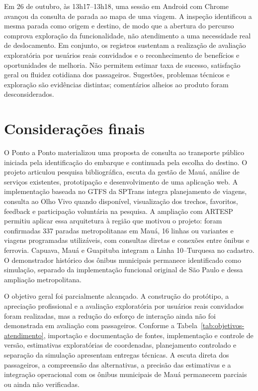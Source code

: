 \documentclass[12pt,oneside,a4paper,brazil,chapter=TITLE]{abntex2}
\begin{document}
Em 26 de outubro, às 13h17--13h18, uma sessão em Android com Chrome avançou da consulta de parada ao mapa de uma viagem. A inspeção identificou a mesma parada como origem e destino, de modo que a abertura do percurso comprova exploração da funcionalidade, não atendimento a uma necessidade real de deslocamento. Em conjunto, os registros sustentam a realização de avaliação exploratória por usuários reais convidados e o reconhecimento de benefícios e oportunidades de melhoria. Não permitem estimar taxa de sucesso, satisfação geral ou fluidez cotidiana dos passageiros. Sugestões, problemas técnicos e exploração são evidências distintas; comentários alheios ao produto foram desconsiderados.



\chapter{Considerações finais}
O Ponto a Ponto materializou uma proposta de consulta ao transporte público iniciada pela identificação do embarque e continuada pela escolha do destino. O projeto articulou pesquisa bibliográfica, escuta da gestão de Mauá, análise de serviços existentes, prototipação e desenvolvimento de uma aplicação web. A implementação baseada no GTFS da SPTrans integra planejamento de viagens, consulta ao Olho Vivo quando disponível, visualização dos trechos, favoritos, feedback e participação voluntária na pesquisa. A ampliação com ARTESP permitiu aplicar essa arquitetura à região que motivou o projeto: foram confirmadas 337 paradas metropolitanas em Mauá, 16 linhas ou variantes e viagens programadas utilizáveis, com consultas diretas e conexões entre ônibus e ferrovia. Capuava, Mauá e Guapituba integram a Linha 10--Turquesa no cadastro. O demonstrador histórico dos ônibus municipais permanece identificado como simulação, separado da implementação funcional original de São Paulo e dessa ampliação metropolitana.

O objetivo geral foi parcialmente alcançado. A construção do protótipo, a apreciação profissional e a avaliação exploratória por usuários reais convidados foram realizadas, mas a redução do esforço de interação ainda não foi demonstrada em avaliação com passageiros. Conforme a Tabela~\ref{tab:objetivos-atendimento}, importação e documentação de fontes, implementação e controle de versão, estimativas exploratórias de coordenadas, planejamento controlado e separação da simulação apresentam entregas técnicas. A escuta direta dos passageiros, a compreensão das alternativas, a precisão das estimativas e a integração operacional com os ônibus municipais de Mauá permanecem parciais ou ainda não verificadas.
\end{document}
